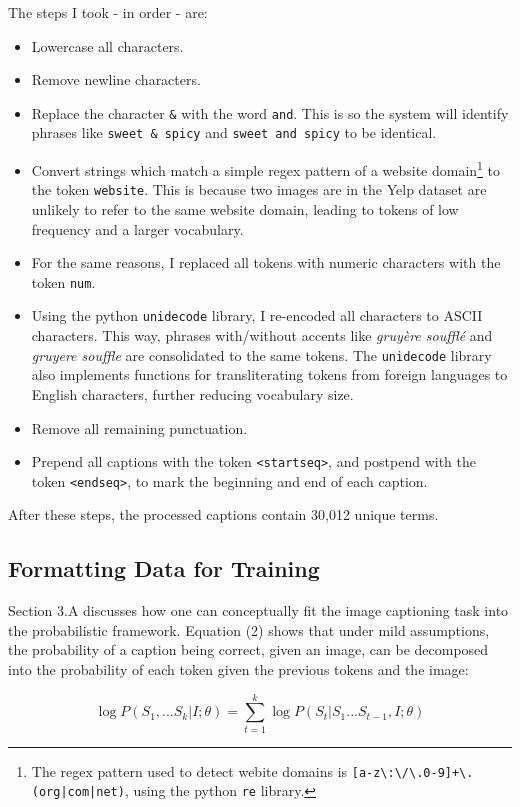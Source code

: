 \documentclass[letterpaper, 10 pt, conference]{ieeeconf}
\newcommand{\code}[1]{\colorbox{light-gray}{\texttt{#1}}}
\begin{document}
The steps I took - in order - are:
\begin{itemize}
\item Lowercase all characters.
\item Remove newline characters.
\item Replace the character \texttt{\&} with the word \texttt{and}. This is so the system will identify phrases like \texttt{sweet \& spicy} and \texttt{sweet and spicy} to be identical.
\item Convert strings which match a simple regex pattern of a website domain\footnote{The regex pattern used to detect webite domains is \texttt{[a-z\textbackslash:\textbackslash/\textbackslash.0-9]+\textbackslash.(org|com|net)}, using the python \texttt{re} library.} to the token \texttt{website}. This is because two images are in the Yelp dataset are unlikely to refer to the same website domain, leading to tokens of low frequency and a larger vocabulary.
\item For the same reasons, I replaced all tokens with numeric characters with the token \texttt{num}.
\item Using the python \code{unidecode} library, I re-encoded all characters to ASCII characters. This way, phrases with/without accents like \textit{gruyère soufflé} and \textit{gruyere souffle} are consolidated to the same tokens. The \code{unidecode} library also implements functions for transliterating tokens from foreign languages to English characters, further reducing vocabulary size.
\item Remove all remaining punctuation.
\item Prepend all captions with the token \texttt{<startseq>}, and postpend with the token \texttt{<endseq>}, to mark the beginning and end of each caption.
\end{itemize}
After these steps, the processed captions contain 30,012 unique terms. 

\subsection{Formatting Data for Training}

Section 3.A discusses how one can conceptually fit the image captioning task into the probabilistic framework. Equation (2) shows that under mild assumptions, the probability of a caption being correct, given an image, can be decomposed into the probability of each token given the previous tokens and the image: 

\begin{equation*}
\log P(S_1, ... S_k | I; \theta) = \sum_{t = 1}^k{\log P(S_t|S_1 ... S_{t-1}, I; \theta)}
\end{equation*}
\end{document}
